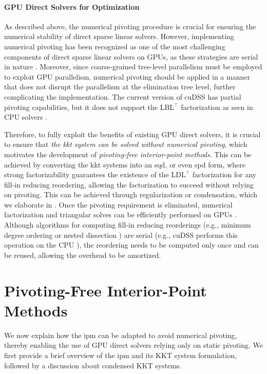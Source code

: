 \documentclass{article}
\begin{document}
\paragraph{GPU Direct Solvers for Optimization}
As described above, the numerical pivoting procedure is crucial for ensuring the numerical stability of direct sparse linear solvers. However, implementing numerical pivoting has been recognized as one of the most challenging components of direct sparse linear solvers on GPUs, as these strategies are serial in nature \cite{swirydowiczLinearSolversPower2022}. Moreover, since coarse-grained tree-level parallelism must be employed to exploit GPU parallelism, numerical pivoting should be applied in a manner that does not disrupt the parallelism at the elimination tree level, further complicating the implementation. The current version of cuDSS has partial pivoting capabilities, but it does not support the LBL$^\top$ factorization as seen in CPU solvers \cite{nvidiaNVIDIACuDSSPreview}.

Therefore, to fully exploit the benefits of existing GPU direct solvers, it is crucial to ensure that \emph{the \gls*{kkt} system can be solved without numerical pivoting}, which motivates the development of \emph{pivoting-free interior-point methods}. This can be achieved by converting the \gls*{kkt} systems into an \gls*{sqd}, or even \gls*{spd} form, where strong factorizability guarantees the existence of the LDL$^\top$ factorization for any fill-in reducing reordering, allowing the factorization to succeed without relying on pivoting. This can be achieved through regularization or condensation, which we elaborate in . Once the pivoting requirement is eliminated, numerical factorization and triangular solves can be efficiently performed on GPUs \cite{naumovParallelSolutionSparse}. Although algorithms for computing fill-in reducing reorderings (e.g., minimum degree ordering \cite{amestoyApproximateMinimumDegree1996} or nested dissection \cite{karypisMETISSoftwarePackage1997}) are serial (e.g., cuDSS performs this operation on the CPU \cite{nvidiaNVIDIACuDSSPreview}), the reordering needs to be computed only once and can be reused, allowing the overhead to be amortized.




\section{Pivoting-Free Interior-Point Methods}\label{sec:ipm}
We now explain how the \gls*{ipm} can be adapted to avoid numerical pivoting, thereby enabling the use of GPU direct solvers relying only on static pivoting. We first provide a brief overview of the \gls*{ipm} and its KKT system formulation, followed by a discussion about condensed KKT systems.
\end{document}
